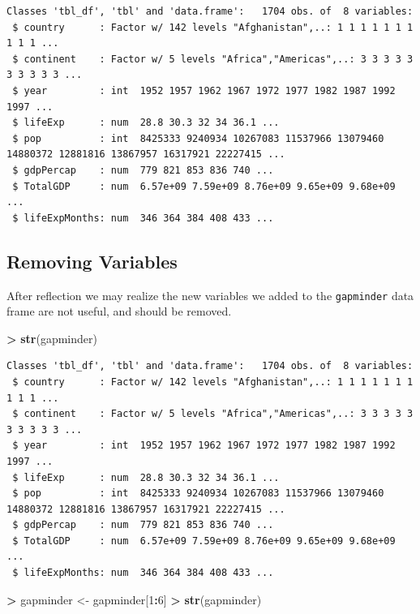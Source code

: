 \documentclass[
]{krantz}
\makeatletter
\newenvironment{Shaded}{\begin{snugshade}}{\end{snugshade}}
\newcommand{\DecValTok}[1]{\textcolor[rgb]{0.06,0.06,0.06}{#1}}
\newcommand{\KeywordTok}[1]{\textcolor[rgb]{0.27,0.27,0.27}{\textbf{#1}}}
\newcommand{\NormalTok}[1]{#1}
\newcommand{\OperatorTok}[1]{\textcolor[rgb]{0.43,0.43,0.43}{\textbf{#1}}}
\newcommand{\StringTok}[1]{\textcolor[rgb]{0.5,0.5,0.5}{#1}}
\newenvironment{kframe}{%
\medskip{}
\setlength{\fboxsep}{.8em}
 \def\at@end@of@kframe{}%
 \ifinner\ifhmode%
  \def\at@end@of@kframe{\end{minipage}}%
  \begin{minipage}{\columnwidth}%
 \fi\fi%
 \def\FrameCommand##1{\hskip\@totalleftmargin \hskip-\fboxsep
 \colorbox{shadecolor}{##1}\hskip-\fboxsep
     \hskip-\linewidth \hskip-\@totalleftmargin \hskip\columnwidth}%
 \MakeFramed {\advance\hsize-\width
   \@totalleftmargin\z@ \linewidth\hsize
   \@setminipage}}%
 {\par\unskip\endMakeFramed%
 \at@end@of@kframe}
\renewenvironment{Shaded}{\begin{kframe}}{\end{kframe}}
\makeatother
\begin{document}
\begin{verbatim}
Classes 'tbl_df', 'tbl' and 'data.frame':   1704 obs. of  8 variables:
 $ country      : Factor w/ 142 levels "Afghanistan",..: 1 1 1 1 1 1 1 1 1 1 ...
 $ continent    : Factor w/ 5 levels "Africa","Americas",..: 3 3 3 3 3 3 3 3 3 3 ...
 $ year         : int  1952 1957 1962 1967 1972 1977 1982 1987 1992 1997 ...
 $ lifeExp      : num  28.8 30.3 32 34 36.1 ...
 $ pop          : int  8425333 9240934 10267083 11537966 13079460 14880372 12881816 13867957 16317921 22227415 ...
 $ gdpPercap    : num  779 821 853 836 740 ...
 $ TotalGDP     : num  6.57e+09 7.59e+09 8.76e+09 9.65e+09 9.68e+09 ...
 $ lifeExpMonths: num  346 364 384 408 433 ...
\end{verbatim}

\hypertarget{removing-variables}{%
\subsection{Removing Variables}\label{removing-variables}}

After reflection we may realize the new variables we added to the \texttt{gapminder} data frame are not useful, and should be removed.

\begin{Shaded}
\begin{Highlighting}[]
\OperatorTok{\textgreater{}}\StringTok{ }\KeywordTok{str}\NormalTok{(gapminder)}
\end{Highlighting}
\end{Shaded}

\begin{verbatim}
Classes 'tbl_df', 'tbl' and 'data.frame':   1704 obs. of  8 variables:
 $ country      : Factor w/ 142 levels "Afghanistan",..: 1 1 1 1 1 1 1 1 1 1 ...
 $ continent    : Factor w/ 5 levels "Africa","Americas",..: 3 3 3 3 3 3 3 3 3 3 ...
 $ year         : int  1952 1957 1962 1967 1972 1977 1982 1987 1992 1997 ...
 $ lifeExp      : num  28.8 30.3 32 34 36.1 ...
 $ pop          : int  8425333 9240934 10267083 11537966 13079460 14880372 12881816 13867957 16317921 22227415 ...
 $ gdpPercap    : num  779 821 853 836 740 ...
 $ TotalGDP     : num  6.57e+09 7.59e+09 8.76e+09 9.65e+09 9.68e+09 ...
 $ lifeExpMonths: num  346 364 384 408 433 ...
\end{verbatim}

\begin{Shaded}
\begin{Highlighting}[]
\OperatorTok{\textgreater{}}\StringTok{ }\NormalTok{gapminder \textless{}{-}}\StringTok{ }\NormalTok{gapminder[}\DecValTok{1}\OperatorTok{:}\DecValTok{6}\NormalTok{]}
\OperatorTok{\textgreater{}}\StringTok{ }\KeywordTok{str}\NormalTok{(gapminder)}
\end{Highlighting}
\end{Shaded}
\end{document}
